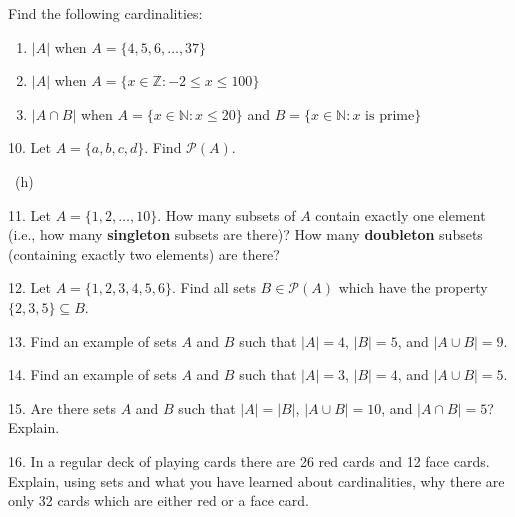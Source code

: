 \documentclass[10pt,]{book}
\newcommand{\terminology}[1]{\textbf{#1}}
\theoremstyle{plain}
\theoremstyle{definition}
\theoremstyle{definition}
\theoremstyle{definition}
\numberwithin{equation}{chapter}
\def\N{\mathbb N}
\def\Z{\mathbb Z}
\def\pow{\mathcal P}
\def\st{:}
\begin{document}
\begin{exerciselist}
Find the following cardinalities: \leavevmode%
\begin{enumerate}[label=(\alph*)]
\item\hypertarget{li-355}{}\(|A|\) when \(A = \{4,5,6,\ldots,37\}\)%
\item\hypertarget{li-356}{}\(|A|\) when \(A = \{x \in \Z \st -2 \le x \le 100\}\)%
\item\hypertarget{li-357}{}\(|A \cap B|\) when \(A = \{x \in \N \st x \le 20\}\) and \(B = \{x \in \N \st x \mbox{ is prime} \}\)%
\end{enumerate}
%
\par\smallskip
\item[10.]\hypertarget{exercise-75}{}\hypertarget{p-2069}{}%
Let \(A = \{a, b, c, d\}\). Find \(\pow(A)\).%
\par\smallskip
~{\tiny (h)}\item[11.]\hypertarget{exercise-76}{}\hypertarget{p-2071}{}%
Let \(A = \{1,2,\ldots, 10\}\). How many subsets of \(A\) contain exactly one element (i.e., how many \terminology{singleton} subsets are there)? How many \terminology{doubleton} subsets (containing exactly two elements) are there?%
\par\smallskip
\item[12.]\hypertarget{exercise-77}{}\hypertarget{p-2072}{}%
Let \(A = \{1,2,3,4,5,6\}\). Find all sets \(B \in \pow(A)\) which have the property \(\{2,3,5\} \subseteq B\).%
\par\smallskip
\item[13.]\hypertarget{exercise-78}{}\hypertarget{p-2073}{}%
Find an example of sets \(A\) and \(B\) such that \(|A| = 4\), \(|B| = 5\), and \(|A \cup B| = 9\).%
\par\smallskip
\item[14.]\hypertarget{exercise-79}{}\hypertarget{p-2075}{}%
Find an example of sets \(A\) and \(B\) such that \(|A| = 3\), \(|B| = 4\), and \(|A \cup B| = 5\).%
\par\smallskip
\item[15.]\hypertarget{exercise-80}{}\hypertarget{p-2076}{}%
Are there sets \(A\) and \(B\) such that \(|A| = |B|\), \(|A\cup B| = 10\), and \(|A\cap B| = 5\)? Explain.%
\par\smallskip
\item[16.]\hypertarget{exercise-81}{}\hypertarget{p-2077}{}%
In a regular deck of playing cards there are 26 red cards and 12 face cards. Explain, using sets and what you have learned about cardinalities, why there are only 32 cards which are either red or a face card.%
\par\smallskip
\end{exerciselist}
\typeout{************************************************}
\typeout{************************************************}
\end{document}
